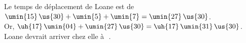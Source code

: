    Le temps de déplacement de Loane est de \\
   $\umin{15}\,\us{30}+\umin{5}+\umin{7} =\umin{27}\,\us{30}$. \\
   Or, $\uh{17}\,\umin{04}+\umin{27}\,\us{30} =\uh{17}\,\umin{31}\,\us{30}$. \\
   {\blue Loane devrait arriver chez elle à \,\,}. \\
